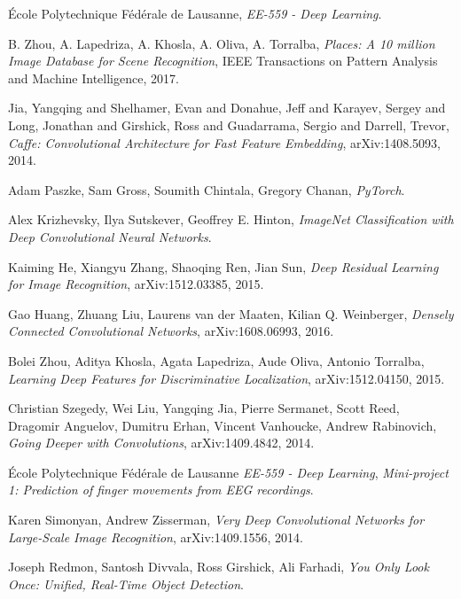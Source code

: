 \begin{thebibliography}{}

	École Polytechnique Fédérale de Lausanne,
	\emph{EE-559 - Deep Learning}.

	B. Zhou, A. Lapedriza, A. Khosla, A. Oliva, A. Torralba,
	\emph{Places: A 10 million Image Database for Scene Recognition},
    IEEE Transactions on Pattern Analysis and Machine Intelligence, 2017.

	Jia, Yangqing and Shelhamer, Evan and Donahue, Jeff and Karayev, Sergey and Long, Jonathan and Girshick, Ross and Guadarrama, Sergio and Darrell, Trevor,
	\emph{Caffe: Convolutional Architecture for Fast Feature Embedding},
    arXiv:1408.5093, 2014.

    Adam Paszke, Sam Gross, Soumith Chintala, Gregory Chanan,
    \emph{PyTorch}.

	Alex Krizhevsky, Ilya Sutskever, Geoffrey E. Hinton,
    \emph{ImageNet Classification with Deep Convolutional Neural Networks}.

	Kaiming He, Xiangyu Zhang, Shaoqing Ren, Jian Sun,
	\emph{Deep Residual Learning for Image Recognition},
    arXiv:1512.03385, 2015.

	Gao Huang, Zhuang Liu, Laurens van der Maaten, Kilian Q. Weinberger,
    \emph{Densely Connected Convolutional Networks},
    arXiv:1608.06993, 2016.

	Bolei Zhou, Aditya Khosla, Agata Lapedriza, Aude Oliva, Antonio Torralba,
	\emph{Learning Deep Features for Discriminative Localization},
	arXiv:1512.04150, 2015.

	Christian Szegedy, Wei Liu, Yangqing Jia, Pierre Sermanet, Scott Reed, Dragomir Anguelov, Dumitru Erhan, Vincent Vanhoucke, Andrew Rabinovich,
	\emph{Going Deeper with Convolutions},
	arXiv:1409.4842, 2014.


	École Polytechnique Fédérale de Lausanne
	\emph{EE-559 - Deep Learning},
	\emph{Mini-project 1: Prediction of finger movements from EEG recordings}.

	Karen Simonyan, Andrew Zisserman,
    \emph{Very Deep Convolutional Networks for Large-Scale Image Recognition},
    arXiv:1409.1556, 2014.

    Joseph Redmon, Santosh Divvala, Ross Girshick, Ali Farhadi,
    \emph{You Only Look Once: Unified, Real-Time Object Detection}.


\end{thebibliography}
